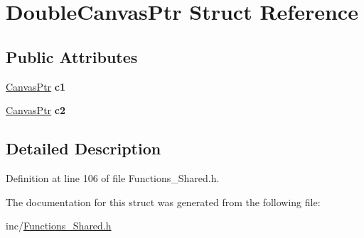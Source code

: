 \hypertarget{structDoubleCanvasPtr}{}\section{Double\+Canvas\+Ptr Struct Reference}
\label{structDoubleCanvasPtr}
\subsection*{Public Attributes}
\begin{DoxyCompactItemize}
\item 
\hypertarget{structDoubleCanvasPtr_a8b1429eab4f3b33fab0d9c9e5463793e}{}\hyperlink{structCanvasPtr}{Canvas\+Ptr} {\bfseries c1}\label{structDoubleCanvasPtr_a8b1429eab4f3b33fab0d9c9e5463793e}

\item 
\hypertarget{structDoubleCanvasPtr_a492dc9e6fc2eb8296e807db5e44c0bed}{}\hyperlink{structCanvasPtr}{Canvas\+Ptr} {\bfseries c2}\label{structDoubleCanvasPtr_a492dc9e6fc2eb8296e807db5e44c0bed}

\end{DoxyCompactItemize}


\subsection{Detailed Description}


Definition at line 106 of file Functions\+\_\+\+Shared.\+h.



The documentation for this struct was generated from the following file\+:\begin{DoxyCompactItemize}
\item 
inc/\hyperlink{Functions__Shared_8h}{Functions\+\_\+\+Shared.\+h}\end{DoxyCompactItemize}
